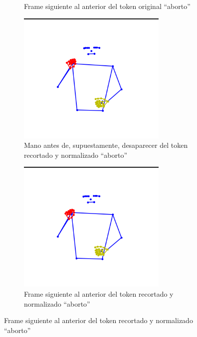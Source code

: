 \begin{figure}[t]
\begin{subfigure}[t]{0.3\textwidth}
		\caption{Frame siguiente al anterior del token original ``aborto''}
		\label{f:no_mano_faltante_1}
	\end{subfigure}
		\vskip 0pt
		\begin{subfigure}[t]{0.3\textwidth}
		\centering
		\includegraphics[align=t,width=0.9\linewidth, height =0.9\linewidth]{Graphics/anterior_a_missing_hand_aborto}
		\caption{Mano antes de, supuestamente, desaparecer del token recortado y normalizado ``aborto''}
		\label{f:no_mano_faltante_0}
	\end{subfigure}
	\hskip 0pt
	\begin{subfigure}[t]{0.3\textwidth}
		\centering
		\includegraphics[align=t,width=0.9\linewidth, height =0.9\linewidth]{Graphics/ya_no_missing_hand_aborto}
		\caption{Frame siguiente al anterior del token recortado y normalizado ``aborto''}
		\label{f:no_mano_faltante_1}
	\end{subfigure}
	

\end{figure}
